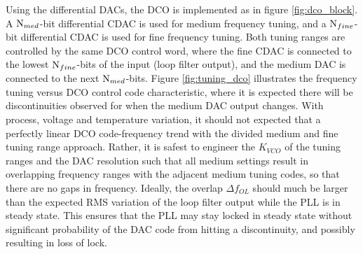 	Using the differential DACs, the DCO is implemented as in figure \ref{fig:dco_block}. A $\textnormal{N}_{med}$-bit differential CDAC is used for medium frequency tuning, and a $\textnormal{N}_{fine}$-bit differential CDAC is used for fine frequency tuning. Both tuning ranges are controlled by the same DCO control word, where the fine CDAC is connected to the lowest $\textnormal{N}_{fine}$-bits of the input (loop filter output), and the medium DAC is connected to the next $\textnormal{N}_{med}$-bits. Figure \ref{fig:tuning_dco} illustrates the frequency tuning versus DCO control code characteristic, where it is expected there will be discontinuities observed for when the medium DAC output changes. With process, voltage and temperature variation, it should not expected that a perfectly linear DCO code-frequency trend with the divided medium and fine tuning range approach. Rather, it is safest to engineer the $K_{VCO}$ of the tuning ranges and the DAC resolution such that all medium settings result in overlapping frequency ranges with the adjacent medium tuning codes, so that there are no gaps in frequency. Ideally, the overlap $\Delta f_{OL}$ should much be larger than the expected RMS variation of the loop filter output while the PLL is in steady state. This ensures that the PLL may stay locked in steady state without significant probability of the DAC code from hitting a discontinuity, and possibly resulting in loss of lock.


